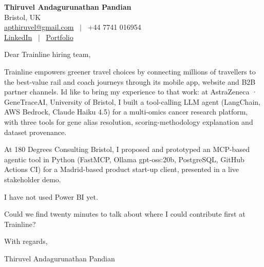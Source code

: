\documentclass[11pt,a4paper]{article}
\begin{document}
\raggedright
\pagestyle{empty}

\begin{center}
    {\LARGE \color{linkblue} \textbf{Thiruvel Andagurunathan Pandian}}\\[0.2cm]
    Bristol, UK \\
    \href{mailto:apthiruvel@gmail.com}{apthiruvel@gmail.com} \ $|$ \ +44 7741 016954 \\
\href{https://www.linkedin.com/in/thiruvel-a-p/}{LinkedIn} \ $|$ \ \href{https://thiruvel-ap.github.io/PersonalPortfolio/}{Portfolio}
\end{center}

\vspace{0.4cm}

\noindent
Dear Trainline hiring team,

Trainline empowers greener travel choices by connecting millions of travellers to the best-value rail and coach journeys through its mobile app, website and B2B partner channels. I\textquotesingle{}d like to bring my experience to that work: at AstraZeneca · GeneTraceAI, University of Bristol, I built a tool-calling LLM agent (LangChain, AWS Bedrock, Claude Haiku 4.5) for a multi-omics cancer research platform, with three tools for gene alias resolution, scoring-methodology explanation and dataset provenance.

At 180 Degrees Consulting Bristol, I proposed and prototyped an MCP-based agentic tool in Python (FastMCP, Ollama gpt-oss:20b, PostgreSQL, GitHub Actions CI) for a Madrid-based product start-up client, presented in a live stakeholder demo.

I have not used Power BI yet.

Could we find twenty minutes to talk about where I could contribute first at Trainline?

\vspace{0.5cm}

With regards,

Thiruvel Andagurunathan Pandian
\end{document}
